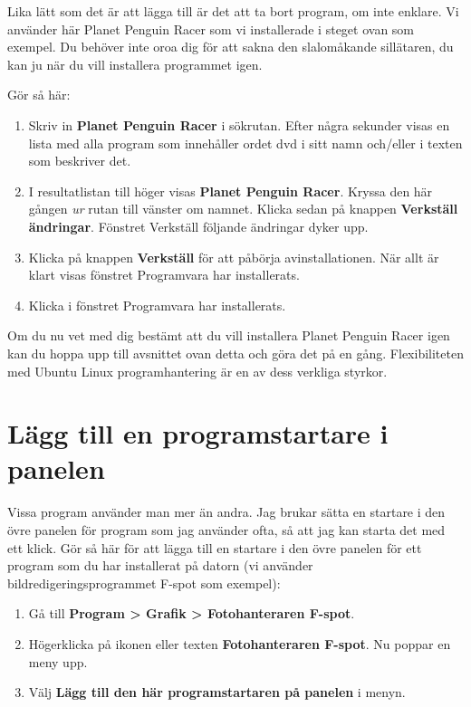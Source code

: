 \documentclass[a4paper,final]{memoir} %
\begin{document}
Lika lätt som det är att lägga till är det att ta bort program, om inte enklare. Vi använder här Planet Penguin Racer som vi installerade i steget ovan som exempel. Du behöver inte oroa dig för att sakna den slalomåkande sillätaren, du kan ju när du vill installera programmet igen.

Gör så här:

\begin{enumerate}

\item Skriv in \textbf{Planet Penguin Racer} i sökrutan. Efter några sekunder visas en lista med alla program som innehåller ordet dvd i sitt namn och/eller i texten som beskriver det. 
\item I resultatlistan till höger visas \textbf{Planet Penguin Racer}. Kryssa den här gången \textit{ur} rutan till vänster om namnet. Klicka sedan på knappen \textbf{Verkställ ändringar}. Fönstret Verkställ följande ändringar dyker upp.
\item Klicka på knappen \textbf{Verkställ} för att påbörja avinstallationen. När allt är klart visas fönstret Programvara har installerats. 
\item Klicka \xstang{} i fönstret Programvara har installerats.

\end{enumerate}

Om du nu vet med dig bestämt att du vill installera Planet Penguin Racer igen kan du hoppa upp till avsnittet ovan detta och göra det på en gång. Flexibiliteten med Ubuntu Linux programhantering är en av dess verkliga styrkor.


\section{Lägg till en programstartare i panelen}\label{enkelprogramstartare}


Vissa program använder man mer än andra. Jag brukar sätta en startare i den övre panelen för program som jag använder ofta, så att jag kan starta det med ett klick. Gör så här för att lägga till en startare i den övre panelen för ett program som du har installerat på datorn (vi använder bildredigeringsprogrammet F-spot som exempel):

\begin{enumerate}

\item Gå till \textbf{Program \textgreater{} Grafik \textgreater{} Fotohanteraren F-spot}.
\item Högerklicka på ikonen eller texten \textbf{Fotohanteraren F-spot}. Nu poppar en meny upp.
\item Välj \textbf{Lägg till den här programstartaren på panelen} i menyn.

\end{enumerate}
\end{document}
